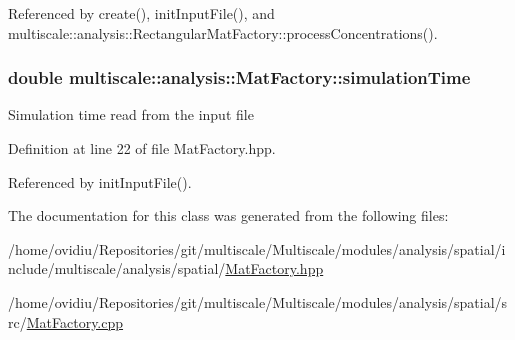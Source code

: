 \-Referenced by create(), init\-Input\-File(), and multiscale\-::analysis\-::\-Rectangular\-Mat\-Factory\-::process\-Concentrations().

\hypertarget{classmultiscale_1_1analysis_1_1MatFactory_a99caa620805ac50375699236d83fbd96}{
\subsubsection[{simulation\-Time}]{\setlength{\rightskip}{0pt plus 5cm}double {\bf multiscale\-::analysis\-::\-Mat\-Factory\-::simulation\-Time}}}\label{classmultiscale_1_1analysis_1_1MatFactory_a99caa620805ac50375699236d83fbd96}
\-Simulation time read from the input file 

\-Definition at line 22 of file \-Mat\-Factory.\-hpp.



\-Referenced by init\-Input\-File().



\-The documentation for this class was generated from the following files\-:\begin{DoxyCompactItemize}
\item 
/home/ovidiu/\-Repositories/git/multiscale/\-Multiscale/modules/analysis/spatial/include/multiscale/analysis/spatial/\hyperlink{MatFactory_8hpp}{\-Mat\-Factory.\-hpp}\item 
/home/ovidiu/\-Repositories/git/multiscale/\-Multiscale/modules/analysis/spatial/src/\hyperlink{MatFactory_8cpp}{\-Mat\-Factory.\-cpp}\end{DoxyCompactItemize}
